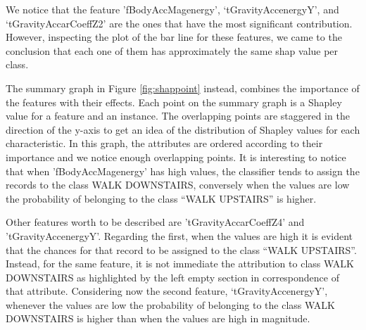 \documentclass[10pt, a4paper, twocolumn]{article}
\begin{document}
We notice that the feature 'fBodyAccMagenergy', ‘tGravityAccenergyY', and ‘tGravityAccarCoeffZ2' are the ones that have the most significant contribution. However, inspecting the plot of the bar line for these features, we came to the conclusion that each one of them has approximately the same shap value per class. 




The summary graph in Figure \ref{fig:shappoint} instead, combines the importance of the features with their effects. Each point on the summary graph is a Shapley value for a feature and an instance. The overlapping points are staggered in the direction of the y-axis to get an idea of the distribution of Shapley values for each characteristic. In this graph, the attributes are ordered according to their importance and we notice enough overlapping points. It is interesting to notice that when 'fBodyAccMagenergy' has high values, the classifier tends to assign the records to the class WALK DOWNSTAIRS, conversely when the values are low the probability of belonging to the class “WALK UPSTAIRS” is higher.

Other features worth to be described are 'tGravityAccarCoeffZ4' and 'tGravityAccenergyY'. Regarding the first, when the values are high it is evident that the chances for that record to be assigned to the class “WALK UPSTAIRS”. Instead, for the same feature, it is not immediate the attribution to class WALK DOWNSTAIRS as highlighted by the left empty section in correspondence of that attribute. Considering now the second feature, ‘tGravityAccenergyY', whenever the values are low the probability of belonging to the class WALK DOWNSTAIRS is higher than when the values are high in magnitude.


\clearpage
\printbibliography
\end{document}
